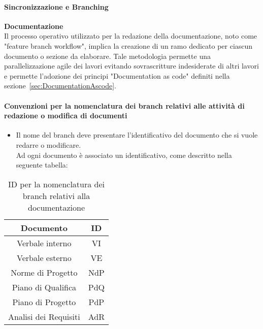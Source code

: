 \paragraph{Sincronizzazione e Branching}
\textbf{Documentazione} \\
Il processo operativo utilizzato per la redazione della documentazione, noto come "feature branch workflow", implica la creazione di un ramo dedicato per ciascun documento o sezione da elaborare.
Tale metodologia permette una parallelizzazione agile dei lavori evitando sovrascritture indesiderate di altri lavori e permette l'adozione dei principi "Documentation as code" definiti nella sezione~\ref{sec:DocumentationAscode}. \\ 

\paragraph*{\hypertarget{par:convezioninomenclaturabranchdocumenti}{\textbf{Convenzioni per la nomenclatura dei branch relativi alle attività di redazione o modifica di documenti}}}

\begin{itemize}
    \item Il nome del branch deve presentare l'identificativo del documento che si vuole redarre o modificare. \\
    Ad ogni documento è associato un identificativo, come descritto nella seguente tabella:
\end{itemize}

\begin{table}[H]
    \centering
    \begin{tabular}{|c|c|}
        \hline
        Documento & ID \\
        \hline
        Verbale interno & VI \\
        Verbale esterno & VE \\
        Norme di Progetto & NdP \\
        Piano di Qualifica & PdQ \\
        Piano di Progetto & PdP \\ 
        Analisi dei Requisiti & AdR \\
        \hline
    \end{tabular}
    \caption{ID per la nomenclatura dei branch relativi alla documentazione}
\end{table}

